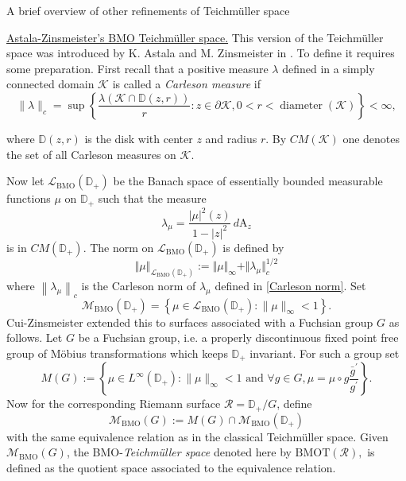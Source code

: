 \documentclass[12pt]{amsart}
\newcommand{\kap}{\mathscr{K}}
\theoremstyle{plain}
\theoremstyle{definition}
\theoremstyle{remark}
\numberwithin{equation}{section} %
\numberwithin{figure}{section} %
\begin{document}
\begin{section}{A brief overview of other refinements of Teichm\"uller space}
      
      {\underline{Astala-Zinsmeister's BMO Teichm\"uller space.}}
         This version of the Teichm\"uller space was introduced by K. Astala and M. Zinsmeister in \cite{AstZins}. To define it requires some preparation.
         First recall that a positive measure \(\lambda\) defined in a simply connected domain \(\kap\) is called a {\it Carleson measure} if
\begin{equation}
    \label{Carleson norm}
    \|\lambda\|_{c}=\sup \left\{\frac{\lambda(\kap \cap \mathbb{D}(z, r))}{r}: z \in \partial \kap, 0<r<\operatorname{diameter}(\kap)\right\}<\infty,
\end{equation}

where \(\mathbb{D}(z, r)\) is the disk with center \(z\) and radius \(r\). By \(C M(\kap)\) one denotes the set
of all Carleson measures on \(\kap\).

Now let  \(\mathcal{L}_\mathrm{BMO}(\mathbb{D}_+)\) be the Banach space of essentially bounded measurable functions \(\mu\) on \(\mathbb{D}_+\) such that the
measure
$$
\lambda_{\mu}=\frac{|\mu|^{2}(z)}{1-|z|^{2}}\, d\mathrm{A}_z
$$
is in \(C M(\mathbb{D}_+)\). The norm on \(\mathcal{L}_\mathrm{BMO}(\mathbb{D}_+)\) is defined by
$$\Vert \mu\Vert_{\mathcal{L}_\mathrm{BMO}(\mathbb{D}_+)}
:= \Vert \mu\Vert_{\infty}+\Vert \lambda_{\mu} \Vert_{c}^{1 / 2}
$$
where \(\left\|\lambda_{\mu}\right\|_{c}\) is the Carleson norm of \(\lambda_{\mu}\) defined in \eqref{Carleson norm}. Set
$$\mathcal{M}_{\mathrm{BMO}}(\mathbb{D}_+)=\left\{\mu \in \mathcal{L}_{\mathrm{BMO}}(\mathbb{D}_+):\|\mu\|_{\infty}<1\right\}.$$
Cui-Zinsmeister \cite{CuiZinsmeister} {extended this to surfaces associated with a Fuchsian group $G$ as follows}. Let \(G\) be a Fuchsian group, i.e. a properly discontinuous fixed point free group of Möbius transformations
which keeps \(\mathbb{D}_+\) invariant. For such a group set
\begin{equation}
    \label{defn: MG}
    M(G):=\left\{\mu \in L^{\infty}(\mathbb{D}_+):\|\mu\|_{\infty}<1 \text { and } \forall g \in G, \mu=\mu \circ g \frac{\bar{g}^{\prime}}{g^{\prime}}\right\}.
\end{equation}
Now for the corresponding Riemann surface \(\mathscr{R}=\mathbb{D}_+ / G\), define $$\mathcal{M}_{\mathrm{BMO}}(G):=M(G) \cap \mathcal{M}_{\mathrm{BMO}}(\mathbb{D}_+)$$ with
the same equivalence relation as in the classical Teichm\"uller space. Given $\mathcal{M}_{\mathrm{BMO}}(G)$, the BMO-{\it{Teichm\"uller space}} denoted here by $\mathrm{BMOT}(\mathscr{R}),$ is defined as the
quotient space associated to the equivalence relation. 



\end{section}
\end{document}

